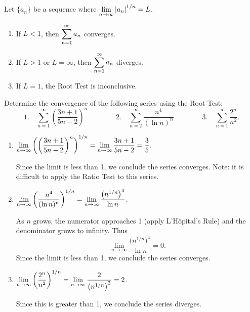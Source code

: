 \begin{theorem}\label{thm:root_test}%
Let $\{a_n\}$ be a sequence %
where $\displaystyle \lim_{n\to \infty}\left\lvert a_n \right\rvert^{1/n} = L$.
	\begin{enumerate}
		\item If $L<1$, then $\displaystyle\sum_{n=1}^\infty a_n$ converges.
		\item If $L>1$ or $L=\infty$, then $\displaystyle\sum_{n=1}^\infty a_n$ diverges.
		\item If $L=1$, the Root Test is inconclusive.
	\end{enumerate}
\end{theorem}



\begin{example}\label{ex_root1}%
Determine the convergence of the following series using the Root Test:
\[
 \text{1.}\quad\sum_{n=1}^\infty \left(\frac{3n+1}{5n-2}\right)^n\qquad\qquad
 \text{2.}\quad\sum_{n=2}^\infty\frac{n^4}{(\ln n)^n}\qquad\qquad
 \text{3.}\quad\sum_{n=1}^\infty \frac{2^n}{n^2}.
\]
\solution
\begin{enumerate}
	\item	$\displaystyle\lim_{n\to\infty} \left(\left(\frac{3n+1}{5n-2}\right)^n\right)^{1/n} = \lim_{n\to\infty} \frac{3n+1}{5n-2} = \frac 35.$ 
	
	Since the limit is less than 1, we conclude the series converges. Note: it is difficult to apply the Ratio Test to this series.
	
	\item	$\displaystyle\lim_{n\to\infty} \left(\frac{n^4}{(\ln n)^n}\right)^{1/n} = \lim_{n\to\infty} \frac {\bigl(n^{1/n}\bigr)^4}{\ln n}  $. 
	
	As $n$ grows, the numerator approaches 1 (apply L'Hôpital's Rule) and the denominator grows to infinity.  Thus
	\[\lim_{n\to\infty} \frac{\bigl(n^{1/n}\bigr)^4}{\ln n} = 0.\]
	Since the limit is less than 1, we conclude the series converges.
	
	\item	$\displaystyle \lim_{n\to\infty} \left(\frac{2^n}{n^2}\right)^{1/n} = \lim_{n\to\infty} \frac{2}{\bigl(n^{1/n}\bigr)^2} = 2$. 
	
	Since this is greater than 1, we conclude the series diverges.
\end{enumerate}
\end{example}

